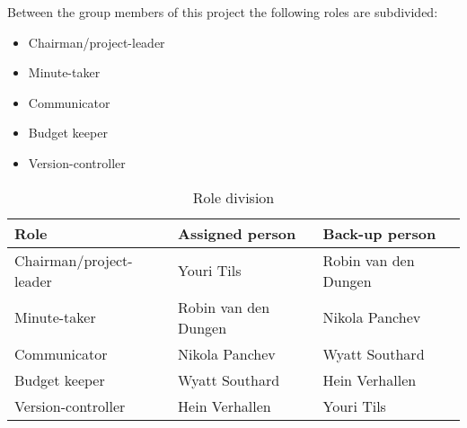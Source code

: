 Between the group members of this project the following roles are subdivided:
\begin{itemize}
    \setlength\itemsep{-0.3em}
    \item Chairman/project-leader
    \item Minute-taker
    \item Communicator
    \item Budget keeper
    \item Version-controller
\end{itemize}

\begin{table}[!h]
    \begin{tabular}{|l|l|l|}
        \hline
        \textbf{Role} & \textbf{Assigned person} & \textbf{Back-up person}\\ \hline
        Chairman/project-leader & Youri Tils & Robin van den Dungen\\ \hline
        Minute-taker & Robin van den Dungen & Nikola Panchev\\ \hline
        Communicator & Nikola Panchev & Wyatt Southard\\ \hline
        Budget keeper & Wyatt Southard & Hein Verhallen\\ \hline
        Version-controller & Hein Verhallen & Youri Tils\\ \hline
    \end{tabular}
    \caption{Role division}
\end{table}